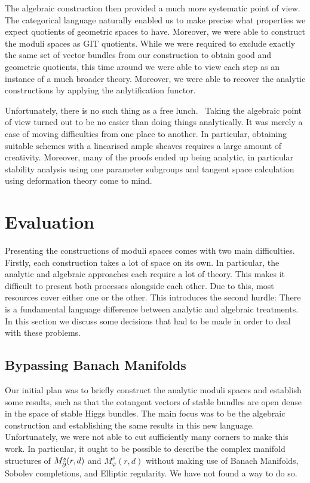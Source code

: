 \documentclass[12pt]{ociamthesis}  %
\begin{document}
The algebraic construction then provided a much more systematic
point of view. The categorical language naturally enabled us to make
precise what properties we expect quotients of geometric spaces to
have. Moreover, we were able to construct the moduli spaces as GIT
quotients. While we were required to exclude exactly the same set of
vector bundles from our construction to obtain good and geometric
quotients, this time around we were able to view each step as an
instance of a much broader theory. Moreover, we were able to recover
the analytic constructions by applying the anlytification functor.

Unfortunately, there is no such thing as a free lunch.~\cite{friedman1977}
Taking the algebraic point of view turned out to be no easier than
doing things analytically. It was merely a case of moving difficulties
from one place to another. In particular, obtaining suitable schemes with
a linearised ample sheaves requires a large amount of creativity.
Moreover, many of the proofs ended up being analytic, in particular
stability analysis using one parameter subgroups
and tangent space calculation using deformation theory come to mind.

\section{Evaluation}

Presenting the constructions of moduli spaces comes with two main
difficulties. Firstly, each construction takes a lot of space on its
own. In particular, the analytic and algebraic approaches each
require a lot of theory. This makes it difficult to present both
processes alongside each other. Due to this, most resources cover
either one or the other. This introduces the second hurdle: There is a
fundamental language difference between analytic and algebraic treatments.
In this section we discuss some decisions that had to be made in
order to deal with these problems.

\subsection{Bypassing Banach Manifolds}

Our initial plan was to briefly construct the analytic moduli spaces
and establish some results, such as that the cotangent vectors of
stable bundles are open dense in the space of stable Higgs bundles.
The main focus was to be the algebraic construction and establishing the
same results in this new language. Unfortunately, we were not able to
cut sufficiently many corners to make this work. In particular,
it ought to be possible to describe the complex
manifold structures of $M^s_{\bar{\partial}}(r,d)$ and $M^s_\varphi(r,d)$
without making use of Banach Manifolds, Sobolev completions, and
Elliptic regularity. We have not found a way to do so.
\end{document}
